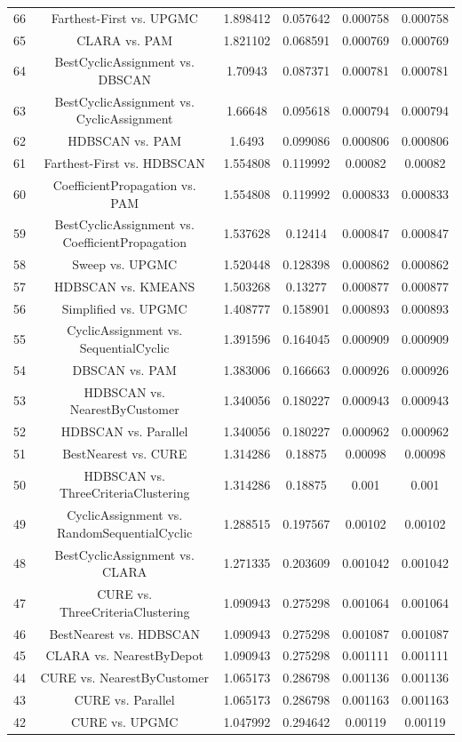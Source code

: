 \documentclass[a4paper,10pt]{article}
\begin{document}
\begin{landscape}
\begin{table}[!htp]
\begin{tabular}{cccccc}
66&Farthest-First vs. UPGMC&1.898412&0.057642&0.000758&0.000758\\
65&CLARA vs. PAM&1.821102&0.068591&0.000769&0.000769\\
64&BestCyclicAssignment vs. DBSCAN&1.70943&0.087371&0.000781&0.000781\\
63&BestCyclicAssignment vs. CyclicAssignment&1.66648&0.095618&0.000794&0.000794\\
62&HDBSCAN vs. PAM&1.6493&0.099086&0.000806&0.000806\\
61&Farthest-First vs. HDBSCAN&1.554808&0.119992&0.00082&0.00082\\
60&CoefficientPropagation vs. PAM&1.554808&0.119992&0.000833&0.000833\\
59&BestCyclicAssignment vs. CoefficientPropagation&1.537628&0.12414&0.000847&0.000847\\
58&Sweep vs. UPGMC&1.520448&0.128398&0.000862&0.000862\\
57&HDBSCAN vs. KMEANS&1.503268&0.13277&0.000877&0.000877\\
56&Simplified vs. UPGMC&1.408777&0.158901&0.000893&0.000893\\
55&CyclicAssignment vs. SequentialCyclic&1.391596&0.164045&0.000909&0.000909\\
54&DBSCAN vs. PAM&1.383006&0.166663&0.000926&0.000926\\
53&HDBSCAN vs. NearestByCustomer&1.340056&0.180227&0.000943&0.000943\\
52&HDBSCAN vs. Parallel&1.340056&0.180227&0.000962&0.000962\\
51&BestNearest vs. CURE&1.314286&0.18875&0.00098&0.00098\\
50&HDBSCAN vs. ThreeCriteriaClustering&1.314286&0.18875&0.001&0.001\\
49&CyclicAssignment vs. RandomSequentialCyclic&1.288515&0.197567&0.00102&0.00102\\
48&BestCyclicAssignment vs. CLARA&1.271335&0.203609&0.001042&0.001042\\
47&CURE vs. ThreeCriteriaClustering&1.090943&0.275298&0.001064&0.001064\\
46&BestNearest vs. HDBSCAN&1.090943&0.275298&0.001087&0.001087\\
45&CLARA vs. NearestByDepot&1.090943&0.275298&0.001111&0.001111\\
44&CURE vs. NearestByCustomer&1.065173&0.286798&0.001136&0.001136\\
43&CURE vs. Parallel&1.065173&0.286798&0.001163&0.001163\\
42&CURE vs. UPGMC&1.047992&0.294642&0.00119&0.00119\\

\end{tabular}
\end{table}
\end{landscape}
\end{document}
